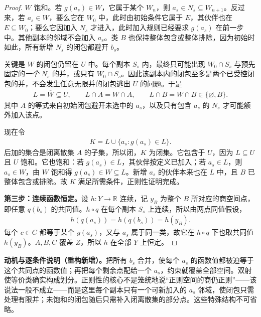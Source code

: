 \documentclass[../../main.tex]{subfiles}
\begin{document}
\begin{proof}
$W$ 饱和。若 $g(a_s)\in W$，它属于某个 $W_n$，则 $a_s\in N_s\subseteq W_{n+1}$。反过来，若 $a_s\in W$，要么它在 $W_0$ 中，此时由初始条件它属于 $E$，其伙伴也在 $E\subseteq W_0$；要么它因加入 $N_s$ 才进入，此时加入规则已经要求 $g(a_s)$ 在前一步中。其他副本的邻域不会加入 $a_s$。类 $B$ 也保持整体包含或整体排除，因为初始时如此，所有新增 $N_s$ 的闭包都避开 $b_s$。

关键是 $W$ 的闭包仍留在 $U$ 中。每个副本 $S_s$ 内，最终只可能出现 $W_0\cap S_s$ 与预先固定的\emph{一个} $N_s$ 的并，或只有 $W_0\cap S_s$。因此该副本内的闭包至多是两个已受控闭包的并，不会发生任意无限并的闭包逃出 $U$ 的问题。于是
\begin{align*}
L=\overline W\subseteq U,
\qquad L\cap A=W\cap A,
\qquad L\cap B=W\cap B\in\{\varnothing,B\}.
\end{align*}
其中 $A$ 的等式来自初始闭包避开未选中的 $a_s$，以及只有包含 $a_s$ 的 $N_s$ 才可能额外加入该点。

现在令
\begin{align*}
K=L\cup\{a_s:g(a_s)\in L\}.
\end{align*}
后加的集合是闭离散集 $A$ 的子集，所以闭，$K$ 为闭集。它包含于 $U$，因为 $L\subseteq U$ 且 $U$ 饱和。它也饱和：若 $g(a_s)\in L$，其伙伴按定义已加入；若 $a_s\in L$，则 $a_s\in W$，由 $W$ 饱和得 $g(a_s)\in W\subseteq L$。新增 $a_s$ 的伙伴本来也在 $L$ 中，且 $B$ 已整体包含或排除。故 $K$ 满足所需条件，正则性证明完成。

\textbf{第三步：连续函数恒定。}设 $h:Y\to\mathbb R$ 连续，记 $y_B$ 为整个 $B$ 所对应的商空间点，即任意 $q(b_s)$ 的共同值。$h\circ q$ 在每个副本 $S_s$ 上连续，所以由两点同值假设，
\begin{align*}
h(q(a_s))=h(q(b_s))=h(y_B).
\end{align*}
每个 $c\in C$ 都等于某个 $g(a_s)$，又与 $a_s$ 属于同一类，故它在 $h\circ q$ 下也取共同值 $h(y_B)$。$A,B,C$ 覆盖 $Z$，所以 $h$ 在全部 $Y$ 上恒定。
\end{proof}
\begin{remark}
\textbf{动机与逐条件说明（重构新增）。}把所有 $b_s$ 合并，使每个 $a_s$ 的函数值都被迫等于这个共同点的函数值；再把每个剩余点配给一个 $a_s$，约束就覆盖全部空间。双射使等价类确实构成划分。正则性的核心不是笼统地说“正则空间的商仍正则”——该说法一般不成立——而是这里每个副本只有一个可新加入的 $a_s$ 邻域，使闭包只需处理有限并；未饱和的闭包随后只需补入闭离散集的部分点。这些特殊结构不可省略。
\end{remark}
\end{document}

